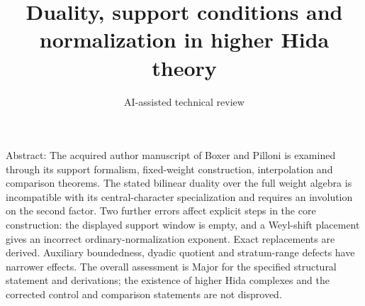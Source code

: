 \documentclass[10pt]{article}
\title{Duality, support conditions and normalization in higher Hida theory}
\author{AI-assisted technical review}
\date{}
\begin{document}
\maketitle
Abstract: The acquired author manuscript of Boxer and Pilloni is examined through its support formalism, fixed-weight construction, interpolation and comparison theorems. The stated bilinear duality over the full weight algebra is incompatible with its central-character specialization and requires an involution on the second factor. Two further errors affect explicit steps in the core construction: the displayed support window is empty, and a Weyl-shift placement gives an incorrect ordinary-normalization exponent. Exact replacements are derived. Auxiliary boundedness, dyadic quotient and stratum-range defects have narrower effects. The overall assessment is Major for the specified structural statement and derivations; the existence of higher Hida complexes and the corrected control and comparison statements are not disproved.\par
\end{document}
